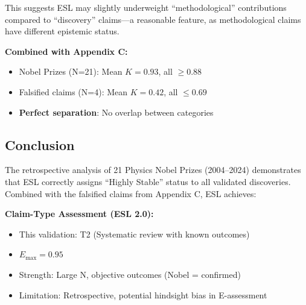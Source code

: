 \documentclass[11pt,a4paper]{article}
\begin{document}
This suggests ESL may slightly underweight ``methodological'' contributions compared to ``discovery'' claims---a reasonable feature, as methodological claims have different epistemic status.

\textbf{Combined with Appendix C:}
\begin{itemize}
    \item Nobel Prizes (N=21): Mean $K = 0.93$, all $\geq 0.88$
    \item Falsified claims (N=4): Mean $K = 0.42$, all $\leq 0.69$
    \item \textbf{Perfect separation}: No overlap between categories
\end{itemize}

\subsection{Conclusion}

The retrospective analysis of 21 Physics Nobel Prizes (2004--2024) demonstrates that ESL correctly assigns ``Highly Stable'' status to all validated discoveries. Combined with the falsified claims from Appendix C, ESL achieves:

\begin{center}
\end{center}

\textbf{Claim-Type Assessment (ESL 2.0):}
\begin{itemize}
    \item This validation: T2 (Systematic review with known outcomes)
    \item $E_{\max} = 0.95$
    \item Strength: Large N, objective outcomes (Nobel = confirmed)
    \item Limitation: Retrospective, potential hindsight bias in E-assessment
\end{itemize}

\end{document}
